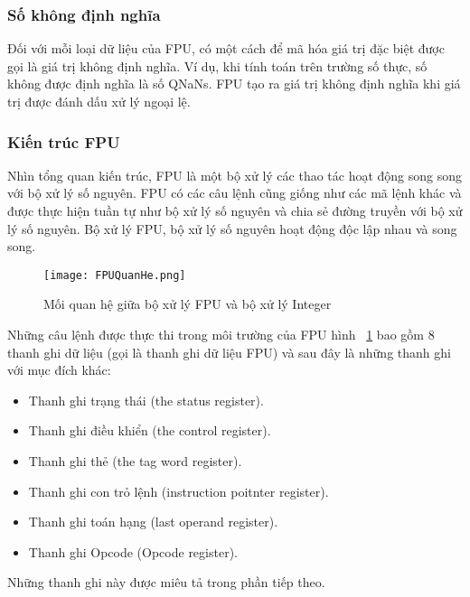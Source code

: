 		\subsubsection*{Số không định nghĩa}
		Đối với mỗi loại dữ liệu của FPU, có một cách để mã hóa giá trị đặc biệt được gọi là giá trị không định nghĩa. Ví dụ, khi tính toán trên trường số thực, số không được định nghĩa là số QNaNs. FPU tạo ra giá trị không định nghĩa khi giá trị được đánh dấu xử lý ngoại lệ.
		
		\subsubsection{Kiến trúc FPU}
		Nhìn tổng quan kiến trúc, FPU là một bộ xử lý các thao tác hoạt động song song với bộ xử lý số nguyên. FPU có các câu lệnh cũng giống như các mã lệnh khác và được thực hiện tuần tự như bộ xử lý số nguyên và chia sẻ đường truyền với bộ xử lý số nguyên. Bộ xử lý FPU, bộ xử lý số nguyên hoạt động độc lập nhau và song song. 
		
		\begin{center}
			\begin{figure}[htp]
				\begin{center}
					\texttt{[image: FPUQuanHe.png]}
				\end{center}
				\caption{Mối quan hệ giữa bộ xử lý FPU và bộ xử lý Integer}				
				\label{fig:FPUQuanHe}				
			\end{figure}
		\end{center}		
		
		Những câu lệnh được thực thi trong môi trường của FPU hình ~\ref{fig:FPUQuanHe} bao gồm 8 thanh ghi dữ liệu (gọi là thanh ghi dữ liệu FPU) và sau đây là những thanh ghi với mục đích khác:
		\begin{itemize}
			\renewcommand{\labelitemi}{\textbullet}	
			\item	Thanh ghi trạng thái (the status register).
			\item	Thanh ghi điều khiển (the control register).
			\item	Thanh ghi thẻ (the tag word register).
			\item	Thanh ghi con trỏ lệnh (instruction poitnter register).
			\item	Thanh ghi toán hạng (last operand register).
			\item	Thanh ghi Opcode (Opcode register).
		\end{itemize}
		
	Những thanh ghi này được miêu tả trong phần tiếp theo.

